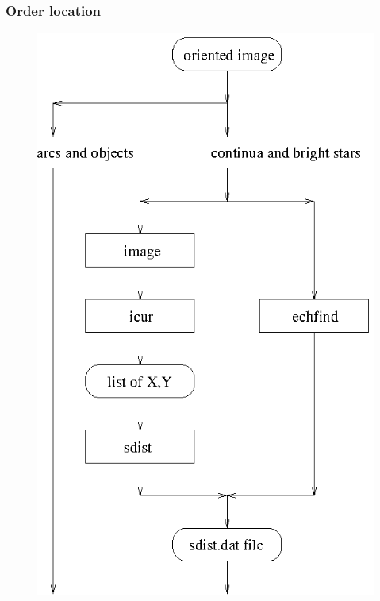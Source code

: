 
\subsubsection{\label{techno13locate}Order location}

\begin{latexonly}
\begin{figure}[htb]
\begin{center}
\includegraphics{sun86_ech2.eps}
\end{center}
\end{figure}
\end{latexonly}

